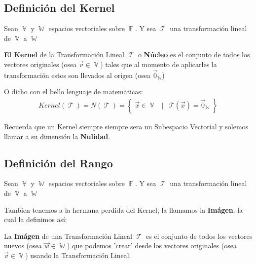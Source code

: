 \documentclass[12pt, fleqn]{report}                             %
\DeclareMathOperator \Space     {\quad}                         %
\DeclareMathOperator \MiniSpace {\;}                            %
\newcommand \Such           {\MiniSpace | \MiniSpace}           %
\theoremstyle{break}                                            %
\DeclareMathOperator \GenericField {\mathbb{F}}                 %
\DeclareMathOperator \VectorSet    {\mathbb{V}}                 %
\DeclareMathOperator \SubVectorSet {\mathbb{W}}                 %
\DeclareMathOperator \LinTrans      {\mathcal{T}}               %
\newcommand{\Set}[1]            {\left\{ \; #1 \; \right\}}     %
\newcommand{\Wrap}[1]           {\left( #1 \right)}             %
\newcommand{\FnLinTrans}[1]{\mathcal{T}\Wrap{#1}}               %
\begin{document}
            \subsection{Definición del Kernel}

                Sean $\VectorSet$ y $\SubVectorSet$ espacios vectoriales sobre $\GenericField$.
                Y sea $\LinTrans$ una transformación lineal de $\VectorSet$ a $\SubVectorSet$

                \textbf{El Kernel} de la Transformación Lineal $\LinTrans$ o \textbf{Núcleo} es el conjunto 
                de todos los vectores originales (osea $\vec v \in \VectorSet$) tales que al momento de
                aplicarles la transformación estos son llevados al origen (osea $\vec 0_{\SubVectorSet}$)

                O dicho con el bello lenguaje de matemáticas:
                \begin{align*}
                    Kernel(\LinTrans) 
                        = N(\LinTrans) 
                        = \Set{\vec x \in \VectorSet \Such \FnLinTrans{\vec x} = \vec 0_{\SubVectorSet}}
                \end{align*}

                Recuerda que un Kernel siempre siempre sera un Subespacio Vectorial y solemos
                llamar a su dimensión la \textbf{Nulidad}.


            \subsection{Definición del Rango}

                Sean $\VectorSet$ y $\SubVectorSet$ espacios vectoriales sobre $\GenericField$.
                Y sea $\LinTrans$ una transformación lineal de $\VectorSet$ a $\SubVectorSet$

                Tambien tenemos a la hermana perdida del Kernel, la llamamos la \textbf{Imágen},
                la cual la definimos así:

                La \textbf{Imágen} de una Transformación Lineal  $\LinTrans$ es el conjunto de todos los vectores
                nuevos (osea $\vec w \in \SubVectorSet$) que podemos 'crear' desde los vectores originales
                (osea $\vec v \in \VectorSet$) usando la Transformación Lineal.
\end{document}
